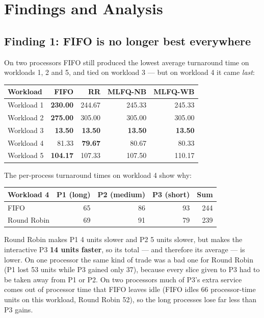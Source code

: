 \documentclass[11pt,a4paper]{article}
\begin{document}
\section{Findings and Analysis}
\subsection{Finding 1: FIFO is no longer best everywhere}

On two processors FIFO still produced the lowest average turnaround time on workloads 1, 2
and 5, and tied on workload 3 --- but on workload 4 it came \emph{last}:

\begin{center}\small
\begin{tabular}{lrrrr}
\toprule
\textbf{Workload} & \textbf{FIFO} & \textbf{RR} & \textbf{MLFQ-NB} & \textbf{MLFQ-WB}\\
\midrule
Workload 1 & \textbf{230.00} & 244.67 & 245.33 & 245.33 \\
Workload 2 & \textbf{275.00} & 305.00 & 305.00 & 305.00 \\
Workload 3 & \textbf{13.50} & \textbf{13.50} & \textbf{13.50} & \textbf{13.50} \\
Workload 4 & 81.33 & \textbf{79.67} & 80.67 & 80.33 \\
Workload 5 & \textbf{104.17} & 107.33 & 107.50 & 110.17 \\
\bottomrule\end{tabular}\end{center}
The per-process turnaround times on workload 4 show why:

\begin{center}\small
\begin{tabular}{lrrrr}
\toprule
\textbf{Workload 4} & \textbf{P1 (long)} & \textbf{P2 (medium)} & \textbf{P3 (short)} & \textbf{Sum}\\
\midrule
FIFO & 65 & 86 & 93 & 244\\
Round Robin & 69 & 91 & 79 & 239\\
\bottomrule
\end{tabular}
\end{center}

Round Robin makes P1 4 units slower and P2 5 units slower, but makes the interactive P3
\textbf{14 units faster}, so its total --- and therefore its average --- is lower. On one
processor the same kind of trade was a bad one for Round Robin (P1 lost 53 units while P3
gained only 37), because every slice given to P3 had to be taken away from P1 or P2. On two
processors much of P3's extra service comes out of processor time that FIFO leaves idle
(FIFO idles 66 processor-time units on this workload, Round Robin 52), so the long processes
lose far less than P3 gains.
\end{document}
